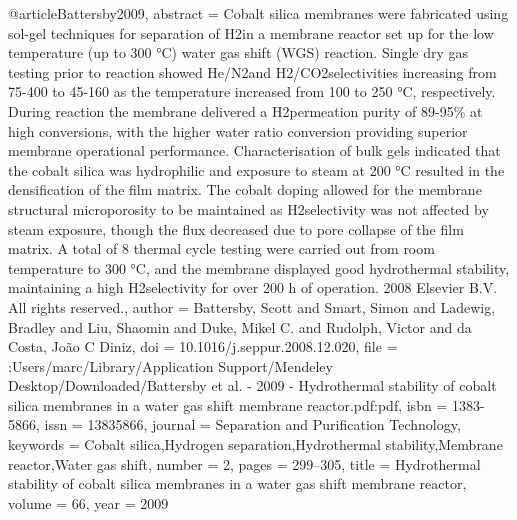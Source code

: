 @article{Battersby2009,
abstract = {Cobalt silica membranes were fabricated using sol-gel techniques for separation of H2in a membrane reactor set up for the low temperature (up to 300 °C) water gas shift (WGS) reaction. Single dry gas testing prior to reaction showed He/N2and H2/CO2selectivities increasing from 75-400 to 45-160 as the temperature increased from 100 to 250 °C, respectively. During reaction the membrane delivered a H2permeation purity of 89-95{\%} at high conversions, with the higher water ratio conversion providing superior membrane operational performance. Characterisation of bulk gels indicated that the cobalt silica was hydrophilic and exposure to steam at 200 °C resulted in the densification of the film matrix. The cobalt doping allowed for the membrane structural microporosity to be maintained as H2selectivity was not affected by steam exposure, though the flux decreased due to pore collapse of the film matrix. A total of 8 thermal cycle testing were carried out from room temperature to 300 °C, and the membrane displayed good hydrothermal stability, maintaining a high H2selectivity for over 200 h of operation. {\textcopyright} 2008 Elsevier B.V. All rights reserved.},
author = {Battersby, Scott and Smart, Simon and Ladewig, Bradley and Liu, Shaomin and Duke, Mikel C. and Rudolph, Victor and da Costa, Jo{\~{a}}o C Diniz},
doi = {10.1016/j.seppur.2008.12.020},
file = {:Users/marc/Library/Application Support/Mendeley Desktop/Downloaded/Battersby et al. - 2009 - Hydrothermal stability of cobalt silica membranes in a water gas shift membrane reactor.pdf:pdf},
isbn = {1383-5866},
issn = {13835866},
journal = {Separation and Purification Technology},
keywords = {Cobalt silica,Hydrogen separation,Hydrothermal stability,Membrane reactor,Water gas shift},
number = {2},
pages = {299--305},
title = {{Hydrothermal stability of cobalt silica membranes in a water gas shift membrane reactor}},
volume = {66},
year = {2009}
}
